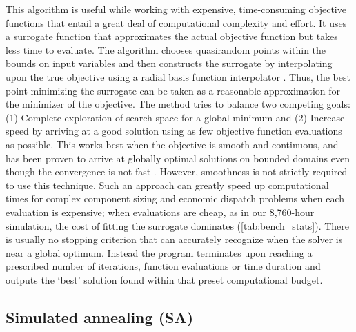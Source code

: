\documentclass[final,3p,times]{elsarticle}
\begin{document}
This algorithm is useful while working with expensive, time-consuming objective functions that entail a great deal of computational complexity and effort. It uses a surrogate function that approximates the actual objective function but takes less time to evaluate. The algorithm chooses quasirandom points within the bounds on input variables and then constructs the surrogate by interpolating upon the true objective using a radial basis function interpolator \cite{gutmann2001}. Thus, the best point minimizing the surrogate can be taken as a reasonable approximation for the minimizer of the objective. The method tries to balance two competing goals: (1) Complete exploration of search space for a global minimum and (2) Increase speed by arriving at a good solution using as few objective function evaluations as possible. This works best when the objective is smooth and continuous, and has been proven to arrive at globally optimal solutions on bounded domains even though the convergence is not fast \cite{gutmann2001}. However, smoothness is not strictly required to use this technique. Such an approach can greatly speed up computational times for complex component sizing and economic dispatch problems when each evaluation is expensive; when evaluations are cheap, as in our 8,760-hour simulation, the cost of fitting the surrogate dominates (\cref{tab:bench_stats}). There is usually no stopping criterion that can accurately recognize when the solver is near a global optimum. Instead the program terminates upon reaching a prescribed number of iterations, function evaluations or time duration and outputs the `best' solution found within that preset computational budget.

\subsection{Simulated annealing (SA)}
\end{document}
